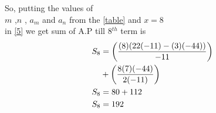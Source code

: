 \documentclass[journal,12pt,twocolumn]{IEEEtran}
\begin{document}
So, putting the values of \\
 $m$ ,$n$ , $a_m$ and $a_n$ from the \eqref{table} and $x = 8$\\
in \eqref{5} we get sum of A.P till 8$^{th}$ term is 
\begin{align}
S_8 &= \left(\frac{(8)(22(-11)-(3)(-44))}{-11}\right)\\\nonumber
&+ \left(\frac{8(7)(-44)}{2(-11)}\right)\\
S_8 &= 80 + 112\\
S_8 &= 192
\end{align} 
\end{document}
